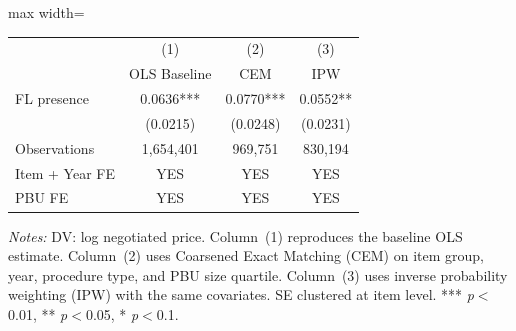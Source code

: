 \begin{adjustbox}{max width=\textwidth}
\begin{threeparttable}
\small
\begin{tabular}{lccc}
\toprule
 & (1) & (2) & (3) \\
 & OLS Baseline & CEM & IPW \\
\midrule
FL presence & 0.0636*** & 0.0770*** & 0.0552** \\
 & (0.0215) & (0.0248) & (0.0231) \\
\midrule
Observations & 1,654,401 & 969,751 & 830,194 \\
Item + Year FE & YES & YES & YES \\
PBU FE & YES & YES & YES \\
\bottomrule
\end{tabular}
\begin{tablenotes}
\small
\item \textit{Notes:} DV: log negotiated price. Column~(1) reproduces the
baseline OLS estimate. Column~(2) uses Coarsened Exact Matching (CEM) on
item group, year, procedure type, and PBU size quartile. Column~(3) uses
inverse probability weighting (IPW) with the same covariates. SE clustered
at item level.
*** \textit{p}$<$0.01, ** \textit{p}$<$0.05, * \textit{p}$<$0.1.
\end{tablenotes}
\end{threeparttable}
\end{adjustbox}
